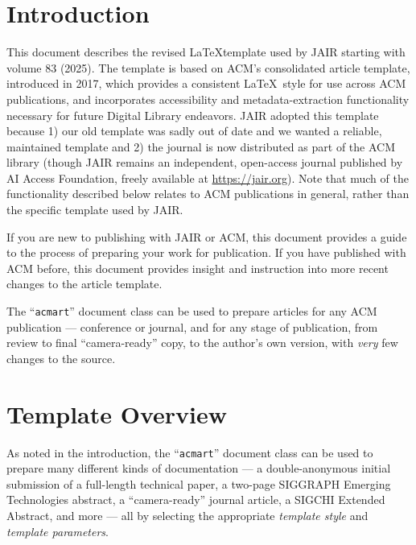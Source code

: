 \documentclass[review]{jair}
\begin{document}



\maketitle

\section{Introduction}
This document describes the revised \LaTeX template used by JAIR starting with volume 83 (2025). The template is based on ACM's consolidated article template, introduced in 2017, which provides a
consistent \LaTeX\ style for use across ACM publications, and
incorporates accessibility and metadata-extraction functionality
necessary for future Digital Library endeavors. JAIR adopted this template because 1) our old template was sadly out of date and we wanted a reliable, maintained template and 2) the journal is now distributed as part of the ACM library (though JAIR remains an independent, open-access journal published by AI Access Foundation, freely available at \url{https://jair.org}). Note that much of the functionality described below relates to ACM publications in general, rather than the specific template used by JAIR.

If you are new to publishing with JAIR or ACM, this document provides a
guide to the process of preparing your work for publication. If you
have published with ACM before, this document provides insight and
instruction into more recent changes to the article template.

The ``\verb|acmart|'' document class can be used to prepare articles
for any ACM publication --- conference or journal, and for any stage
of publication, from review to final ``camera-ready'' copy, to the
author's own version, with {\itshape very} few changes to the source.

\section{Template Overview}
As noted in the introduction, the ``\verb|acmart|'' document class can
be used to prepare many different kinds of documentation --- a
double-anonymous initial submission of a full-length technical paper, a
two-page SIGGRAPH Emerging Technologies abstract, a ``camera-ready''
journal article, a SIGCHI Extended Abstract, and more --- all by
selecting the appropriate {\itshape template style} and {\itshape
  template parameters}.
\end{document}
